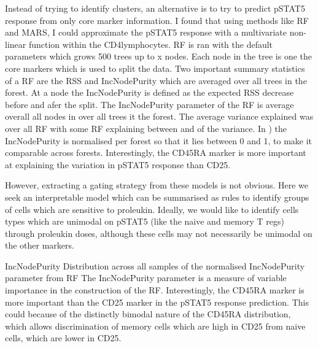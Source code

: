 Instead of trying to identify clusters, an alternative is to try to predict pSTAT5 response from only core marker information.
I found that using methods like \gls{RF} and \gls{MARS},
I could approximate the pSTAT5 response with a multivariate non-linear function within
the CD4\positive lymphocytes.
\gls{RF} is ran with the default parameters which grows 500 trees up to x nodes.
Each node in the tree is one the core markers which is used to split the data.
Two important summary statistics of a RF are the \gls{RSS} and IncNodePurity which are averaged over all trees in the forest.
At a node the IncNodePurity is defined as the expected \gls{RSS} decrease before and afer the split.
The IncNodePurity parameter of the RF is average overall all nodes in over all trees it the forest.
The average variance explained was  over all \gls{RF} with some \gls{RF} explaining between  and  of the variance.
In ) the IncNodePurity is normalised per forest so that it lies between 0 and 1, to make it comparable across forests.
Interestingly, the CD45RA marker is more important at explaining the variation in pSTAT5 response than CD25.

However, extracting a gating strategy from these models is not obvious.
Here we seek an interpretable model which can be summarised as rules to identify groups of cells which are sensitive to proleukin.
Ideally, we would like to identify cells types which are unimodal on pSTAT5 (like the naive and memory T regs) through proleukin doses,
although these cells may not necessarily be unimodal on the other markers.

{IncNodePurity}
{
  Distribution across all samples of the normalised IncNodePurity parameter from \acrfull{RF}
}
{
  The IncNodePurity parameter is a measure of variable importance in the construction of the \acrfull{RF}.
  Interestingly, the CD45RA marker is more important than the CD25 marker in the pSTAT5 response prediction.
  This could because of the distinctly bimodal nature of the CD45RA distribution, which allows discrimination of memory cells which are high in CD25
  from naive cells, which are lower in CD25.
}



